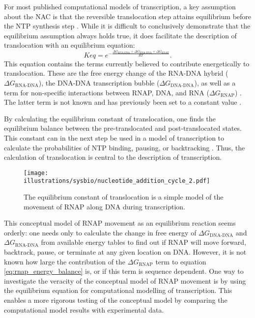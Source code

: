 For most published computational models of transcription, a key assumption
about the NAC is that the reversible translocation step attains equilibrium
before the NTP synthesis step \cite{greive_thinking_2005,
bai_mechanochemical_2007, guajardo_model_1997}. While it is difficult to
conclusively demonstrate that the equilibrium assumption always holds true, it
does facilitate the description of translocation with an equilibrium equation:
\begin{equation}
	Keq = e^{-\frac{\Delta G_{\text{RNA-DNA}} + \Delta
	G_{\text{DNA-DNA}} + \Delta G_{\text{RNAP}}}{RT}}.
	\label{eq:rnap_energy_balance}
\end{equation}
This equation contains the terms currently believed to contribute energetically
to translocation. These are the free energy change of the RNA-DNA hybrid
($\Delta G_{\text{RNA-DNA}}$), the DNA-DNA transcription bubble ($\Delta
G_{\text{DNA-DNA}}$), as well as a term for non-specific interactions between
RNAP, DNA, and RNA ($\Delta G_{\text{RNAP}}$) \cite{greive_thinking_2005}. The
latter term is not known and has previously been set to a
constant value \cite{tadigotla_thermodynamic_2006,
bai_sequence-dependent_2004}.

By calculating the equilibrium constant of translocation, one finds the
equilibrium balance between the pre-translocated and post-translocated states.
This constant can in the next step be used in a model of transcription to
calculate the probabilities of NTP binding, pausing, or backtracking
\cite{greive_thinking_2005, bai_mechanochemical_2007, guajardo_model_1997}.
Thus, the calculation of translocation is central to the description of
transcription.

\begin{figure}[htb]
	\begin{center}
		\texttt{[image: illustrations/sysbio/nucleotide\_addition\_cycle\_2.pdf]}
	\end{center}
	\caption{The equilibrium constant of translocation is a simple
	model of the movement of RNAP along DNA during transcription.}
	\label{fig:nac_2}
\end{figure}

This conceptual model of RNAP movement as an equilibrium reaction seems
orderly: one needs only to calculate the change in free energy of $\Delta
G_{\text{DNA-DNA}}$ and $\Delta G_{\text{RNA-DNA}}$ from available energy
tables \cite{wu_temperature_2002, santalucia_thermodynamics_2004} to find out
if RNAP will move forward, backtrack, pause, or terminate at any given location
on DNA. However, it is not known how large the contribution of the $\Delta
G_{\text{RNAP}}$ term to equation \eqref{eq:rnap_energy_balance} is, or if
this term is sequence dependent. One way to investigate the veracity of
the conceptual model of RNAP movement is by using the equilibrium equation for
computational modelling of transcription. This enables a more rigorous testing
of the conceptual model by comparing the computational model results with
experimental data.

